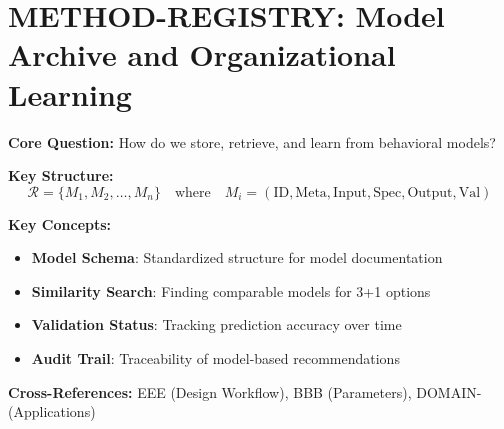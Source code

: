 \chapter{METHOD-REGISTRY: Model Archive and Organizational Learning}
\label{app:method-registry}

\begin{abstract}
This appendix defines the Model Registry---a structured archive storing all
behavioral models designed from the Evidence-Based Framework (EBF). The Registry
serves three functions: (1) enabling the 3+1 Choice Architecture through
similarity search, (2) maintaining audit trails for model-based recommendations,
and (3) facilitating organizational learning across projects. The Registry schema
captures model metadata, inputs, specifications, outputs, and validation status.
\end{abstract}

\begin{tcolorbox}[colback=blue!5!white, colframe=blue!75!black,
    title=Quick Reference: Model Registry]

\textbf{Core Question:} How do we store, retrieve, and learn from behavioral models?

\textbf{Key Structure:}
\begin{equation}
\mathcal{R} = \{M_1, M_2, \ldots, M_n\} \quad \text{where} \quad M_i = (\text{ID}, \text{Meta}, \text{Input}, \text{Spec}, \text{Output}, \text{Val})
\end{equation}

\textbf{Key Concepts:}
\begin{itemize}[nosep]
\item \textbf{Model Schema}: Standardized structure for model documentation
\item \textbf{Similarity Search}: Finding comparable models for 3+1 options
\item \textbf{Validation Status}: Tracking prediction accuracy over time
\item \textbf{Audit Trail}: Traceability of model-based recommendations
\end{itemize}

\textbf{Cross-References:} EEE (Design Workflow), BBB (Parameters), DOMAIN- (Applications)
\end{tcolorbox}



